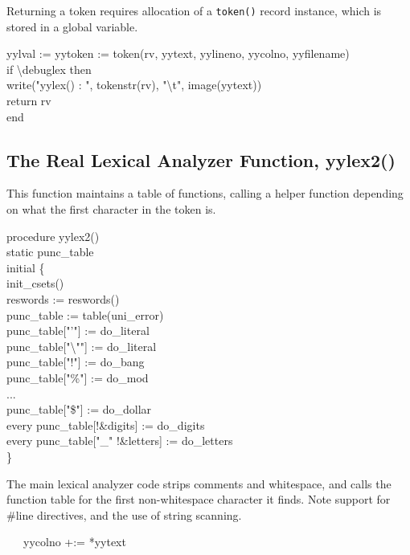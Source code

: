 Returning a token requires allocation of a \texttt{token()} record
instance, which is stored in a global variable.

\begin{iconcode}
\>   yylval := yytoken := token(rv, yytext, yylineno, yycolno, yyfilename) \\
\>   if {\textbackslash}debuglex then \\
\> \>     write("yylex() : ", tokenstr(rv), "{\textbackslash}t", image(yytext))\\
\>   return rv \\
end
\end{iconcode}

\subsection{The Real Lexical Analyzer Function, yylex2()}

This function maintains a table of functions, calling a helper
function depending on what the first character in the token is.

\begin{iconcode}
procedure yylex2() \\
static punc\_table \\
initial \{ \\
\>   init\_csets() \\
\>   reswords := reswords() \\
\>   punc\_table := table(uni\_error) \\
\>   punc\_table["'"] := do\_literal \\
\>   punc\_table["{\textbackslash}""] := do\_literal \\
\>   punc\_table["!"] := do\_bang \\
\>   punc\_table["\%"] := do\_mod \\
\>   ... \\
\>   punc\_table["\$"] := do\_dollar \\
\>   every punc\_table[!\&digits] := do\_digits \\
\>   every punc\_table["\_" {\textbar} !\&letters] := do\_letters \\
\>   \}
\end{iconcode}


The main lexical analyzer code strips comments and whitespace, and calls the function table for the first non-whitespace
character it finds. Note support for \#line directives, and the use of string scanning. 

{\ttfamily\mdseries
\ \ \ yycolno +:= *yytext}


